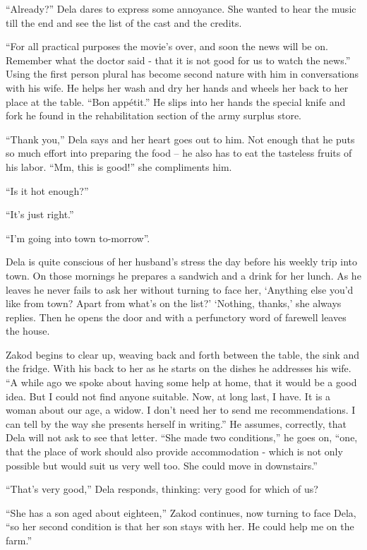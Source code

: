 \documentclass[twoside,11pt]{book}
\begin{document}
``Already?'' Dela dares to express some annoyance. She wanted to hear the music till the end
and see the list of the cast and the credits.

``For all practical purposes the movie's over, and soon the news will be on. Remember what the doctor said
- that it is not good for us to watch the news.'' Using the first person plural has become second nature
with him in conversations with his wife. He helps her wash and dry her hands and wheels her back to her place at the
table. ``Bon app\'etit.'' He slips into her hands the special knife and fork he found in the
rehabilitation section of the army surplus store.

``Thank you,'' Dela says and her heart goes out to him. Not enough that he puts so much
effort into preparing the food -- he also has to eat the tasteless fruits of his labor. ``Mm, this is
good!'' she compliments him.

``Is it hot enough?''

``It's just right.''

``I'm going into town to-morrow''.

Dela is quite conscious of her husband's stress the day before his weekly trip into town. On those mornings he prepares
a sandwich and a drink for her lunch. As he leaves he never fails to ask her without turning to face her, `Anything
else you'd like from town? Apart from what's on the list?' `Nothing, thanks,' she always replies. Then he opens the
door and with a perfunctory word of farewell leaves the house.

Zakod begins to clear up, weaving back and forth between the table, the sink and the fridge. With his back to her as he
starts on the dishes he addresses his wife. ``A while ago we spoke about having some help at home, that it
would be a good idea. But I could not find anyone suitable. Now, at long last, I have. It is a woman about our age, a
widow.  I don't need her to send me recommendations. I can tell by the way she presents herself in
writing.'' He assumes, correctly, that Dela will not ask to see that letter. ``She made
two conditions,'' he goes on, ``one, that the place of work should also provide accommodation - which is
not only possible but would suit us very well too.  She could move in downstairs.''

``That's very good,'' Dela responds, thinking: very good for which of us?

``She has a son aged about eighteen,'' Zakod continues, now turning to face Dela,
``so her second condition is that her son stays with her. He could help me on the farm.''
\end{document}
